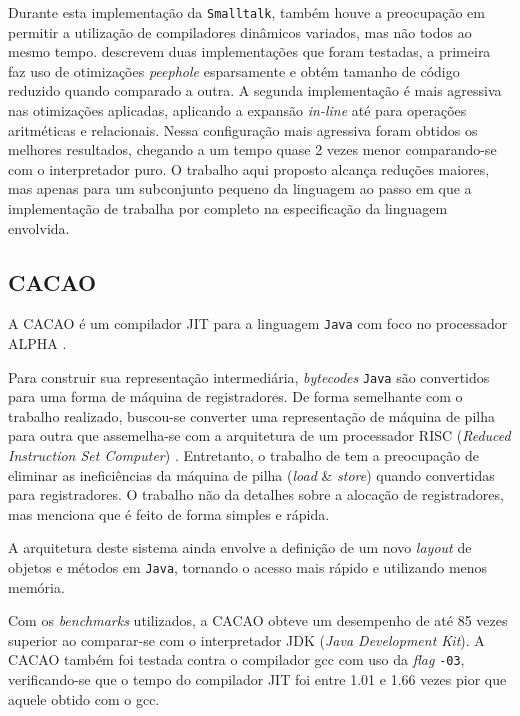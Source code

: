 Durante esta implementação da \texttt{Smalltalk}, também houve a
preocupação em permitir a utilização de compiladores dinâmicos
variados, mas não todos ao mesmo tempo.
 descrevem duas implementações
que foram testadas, a primeira faz uso de otimizações \textit{peephole}
\cite{muchnick} esparsamente e obtém tamanho de código reduzido
quando comparado a outra. A segunda implementação é mais agressiva nas
otimizações aplicadas, aplicando a expansão \textit{in-line} até para
operações aritméticas e relacionais. Nessa configuração mais agressiva
foram obtidos os melhores resultados, chegando a um tempo quase 2
vezes menor comparando-se com o interpretador puro. O trabalho aqui
proposto alcança reduções maiores, mas apenas para um subconjunto
pequeno da linguagem ao passo em que a implementação de
 trabalha por completo na
especificação da linguagem envolvida.


\subsection{CACAO}

A CACAO \cite{cacao} é um compilador JIT para a linguagem
\texttt{Java} com foco no processador ALPHA \cite{alphaproc}.

Para construir sua representação intermediária, \textit{bytecodes}
\texttt{Java} são convertidos para uma forma de máquina de registradores. De
forma semelhante com o trabalho realizado, buscou-se converter uma
representação de máquina de pilha para outra que assemelha-se com a
arquitetura de um processador RISC (\textit{Reduced Instruction Set
  Computer}) \cite{risc}
.
Entretanto, o trabalho de  tem a preocupação
de eliminar as ineficiências da máquina de pilha  (\textit{load} \&
\textit{store}) quando convertidas para registradores. O trabalho não
da detalhes sobre a alocação de registradores, mas menciona que é
feito de forma simples e rápida.

A arquitetura deste sistema ainda envolve a definição de um novo
\textit{layout} de objetos e métodos em \texttt{Java}, tornando o
acesso mais rápido e utilizando menos memória.

Com os \textit{benchmarks} utilizados, a CACAO obteve um desempenho de
até 85 vezes superior ao comparar-se com o interpretador JDK
(\textit{Java Development Kit}).
A CACAO também foi testada
contra o compilador gcc \cite{gcc1} com uso da \textit{flag}
\verb!-03!, verificando-se que o tempo do compilador JIT foi
entre 1.01 e 1.66 vezes pior que aquele obtido com o gcc.

